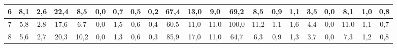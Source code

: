 \begin{sidewaystable}[]
\begin{tabular}{|c|c|c|c|c|c|c|c|c|c|c|c|c|c|c|c|c|c|c|c|c|}
    6  & 8,1                                              & 2,6                                              & 22,4                                             & 8,5                                              & 0,0                                              & 0,7                                              & 0,5                                              & 0,2                                              & 67,4                                            & 13,0                                            & 9,0                                             & 69,2                                            & 8,5                                             & 0,9                                             & 1,1                                             & 3,5                                             & 0,0                                             & 8,1                                              & 1,0                                              &  0,8                                               \\ \hline
    7  & 5,8                                              & 2,8                                              & 17,6                                             & 6,7                                              & 0,0                                              & 1,5                                              & 0,6                                              & 0,4                                              & 60,5                                            & 11,0                                            & 11,0                                            & 100,0                                           & 11,2                                            & 1,1                                             & 1,6                                             & 4,4                                             & 0,0                                             & 11,0                                             & 1,1                                              &  0,7                                               \\ \hline
    8  & 5,6                                              & 2,7                                              & 20,3                                             & 10,2                                             & 0,0                                              & 1,3                                              & 0,6                                              & 0,3                                              & 85,9                                            & 17,0                                            & 11,0                                            & 64,7                                            & 6,3                                             & 0,9                                             & 1,3                                             & 3,7                                             & 0,0                                             & 7,3                                              & 1,2                                              &  0,8                                               \\ \hline

\end{tabular}
\end{sidewaystable}
